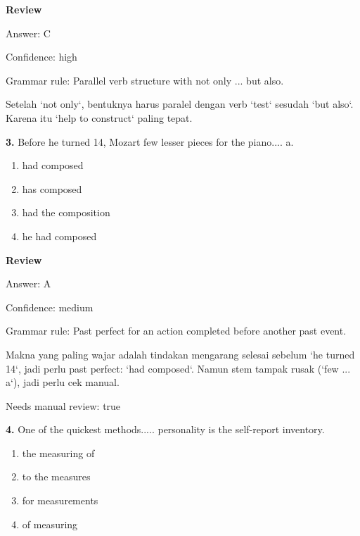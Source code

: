 \documentclass[12pt]{article}
\begin{document}
\par
\begingroup
\setlength{\parskip}{0pt}
\setlength{\parindent}{0pt}
\textbf{Review}\par
Answer: C\par
Confidence: high\par
Grammar rule: Parallel verb structure with not only ... but also.\par
Setelah `not only`, bentuknya harus paralel dengan verb `test` sesudah `but also`. Karena itu `help to construct` paling tepat.\par
\endgroup
\par
\vspace{0.25\baselineskip}
\noindent\textbf{3.} Before he turned 14, Mozart few lesser pieces for the piano.... a.
\begin{enumerate}[label=(\Alph*),leftmargin=*,itemsep=0.2em]
\item had composed
\item has composed
\item had the composition
\item he had composed
\end{enumerate}
\par
\begingroup
\setlength{\parskip}{0pt}
\setlength{\parindent}{0pt}
\textbf{Review}\par
Answer: A\par
Confidence: medium\par
Grammar rule: Past perfect for an action completed before another past event.\par
Makna yang paling wajar adalah tindakan mengarang selesai sebelum `he turned 14`, jadi perlu past perfect: `had composed`. Namun stem tampak rusak (`few ... a`), jadi perlu cek manual.\par
Needs manual review: true\par
\endgroup
\par
\vspace{0.25\baselineskip}
\noindent\textbf{4.} One of the quickest methods..... personality is the self-report inventory.
\begin{enumerate}[label=(\Alph*),leftmargin=*,itemsep=0.2em]
\item the measuring of
\item to the measures
\item for measurements
\item of measuring
\end{enumerate}
\par
\begingroup
\setlength{\parskip}{0pt}
\setlength{\parindent}{0pt}
\end{document}

